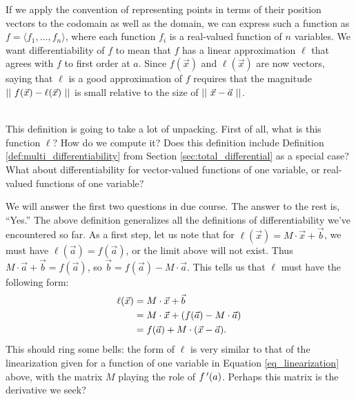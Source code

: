 If we apply the convention of representing points in terms of their position vectors to the codomain as well as the domain, we can express such a function as $f=\langle f_1,\ldots, f_n\rangle$, where each function $f_i$ is a real-valued function of $n$ variables. We want differentiability of $f$ to mean that $f$ has a linear approximation $\ell$ that agrees with $f$ to first order at $a$. Since $f(\vec{x})$ and $\ell(\vec{x})$ are now vectors, saying that $\ell$ is a good approximation of $f$ requires that the magnitude $||\ f(\vec{x})-\ell(\vec{x})\ ||$ is small relative to the size of $||\ \vec{x}-\vec{a}\ ||$.\\

\\
\enlargethispage{2\baselineskip}

This definition is going to take a lot of unpacking. First of all, what is this function $\ell$? How do we compute it? Does this definition include Definition \ref{def:multi_differentiability} from Section \ref{sec:total_differential} as a special case? What about differentiability for vector-valued functions of one variable, or real-valued functions of one variable?

We will answer the first two questions in due course. The answer to the rest is, ``Yes.'' The above definition generalizes all the definitions of differentiability we've encountered so far. As a first step, let us note that for $\ell(\vec{x})=M\cdot \vec{x}+\vec{b}$, we must have $\ell(\vec{a})=f(\vec{a})$, or the limit above will not exist. Thus $M\cdot \vec{a}+\vec{b} = f(\vec{a})$, so $\vec{b}=f(\vec{a})-M\cdot \vec{a}$. This tells us that $\ell$ must have the following form:
\begin{align}
\ell(\vec{x}) &= M\cdot \vec{x} + \vec{b}\notag\\
&= M\cdot \vec{x} + (f(\vec{a}) - M\cdot \vec{a})\notag\\
& = f(\vec{a})+M\cdot (\vec{x}-\vec{a}).\label{eq_gen_linear}
\end{align}
This should ring some bells: the form of $\ell$ is very similar to that of the linearization given for a function of one variable in Equation \eqref{eq_linearization} above, with the matrix $M$ playing the role of $f\,'(a)$. Perhaps this matrix is the derivative we seek?\pagebreak
 
